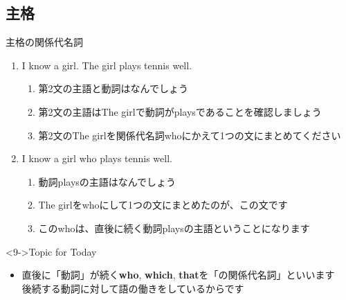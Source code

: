 \documentclass[aspectratio=169,xcolor={dvipsnames,table}]{beamer}
\begin{document}
\subsection{主格}
\begin{frame}[plain,t]{主格の関係代名詞}

\begin{enumerate}
 \item<1-> I know a girl. The girl plays tennis well.
       \begin{enumerate}
	\item<2-> 第2文の主語と動詞はなんでしょう
	\item<3-> 第2文の主語はThe girlで動詞がplaysであることを確認しましょう
	\item<4-> 第2文のThe girlを関係代名詞whoにかえて1つの文にまとめてください
       \end{enumerate}
 \item<5-> I know a girl who plays tennis well.
       \begin{enumerate}
	\item<6-> 動詞playsの主語はなんでしょう
	\item<7-> The girlをwhoにして1つの文にまとめたのが、この文です
	\item<8-> このwhoは、直後に続く動詞playsの主語ということになります
       \end{enumerate}
\end{enumerate}


\vspace{25pt}


\begin{block}<9->{Topic for Today}
\small
\small
 \begin{itemize}[square]
  \item  直後に「動詞」が続く\textbf{who}, \textbf{which}, \textbf{that}を「の関係代名詞」といいます\\
\hfill{\scriptsize 後続する動詞に対して語の働きをしているからです}\raisebox{0pt}{\dbend}\\
\mbox{}
\end{itemize}
     \end{block}

\end{frame}
\end{document}
